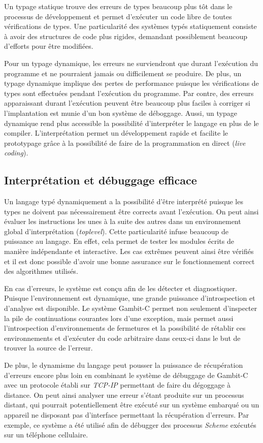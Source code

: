 \documentclass[12pt,twoside,letterpaper,francais]{book}
\newcommand{\Schemelang}{{\textit{Scheme }}}
\begin{document}
Un typage statique trouve des erreurs de types beaucoup plus tôt dans
le processus de développement et permet d'exécuter un code libre de
toutes vérifications de types. Une particularité des systèmes typés
statiquement consiste à avoir des structures de code plus rigides,
demandant possiblement beaucoup d'efforts pour être modifiées.

Pour un typage dynamique, les erreurs ne surviendront que durant
l'exécution du programme et ne pourraient jamais ou difficilement se
produire. De plus, un typage dynamique implique des pertes de
performance puisque les vérifications de types sont effectuées pendant
l'exécution du programme. Par contre, des erreurs apparaissant durant
l'exécution peuvent être beaucoup plus faciles à corriger si
l'implantation est munie d'un bon système de déboggage. Aussi, un
typage dynamique rend plus accessible la possibilité d'interpréter le
langage en plus de le compiler. L'interprétation permet un
développement rapide et facilite le prototypage grâce à la possibilité
de faire de la programmation en direct (\textit{live coding}).


\FloatBarrier
\subsection{Interprétation et débuggage efficace}
Un langage typé dynamiquement a la possibilité d'être interprété
puisque les types ne doivent pas nécessairement être corrects avant
l'exécution. On peut ainsi évaluer les instructions les unes à la
suite des autres dans un environnement global d'interprétation
(\textit{toplevel}). Cette particularité infuse beaucoup de puissance
au langage. En effet, cela permet de tester les modules écrits de
manière indépendante et interactive. Les cas extrêmes peuvent ainsi
être vérifiés et il est donc possible d'avoir une bonne assurance sur
le fonctionnement correct des algorithmes utilisés.

En cas d'erreurs, le système est conçu afin de les détecter et
diagnostiquer. Puisque l'environnement est dynamique, une grande
puissance d'introspection et d'analyse est disponible. Le système
Gambit-C permet non seulement d'inspecter la pile de continuations
courantes lors d'une exception, mais permet aussi l'introspection
d'environnements de fermetures et la possibilité de rétablir ces
environnements et d'exécuter du code arbitraire dans ceux-ci dans le
but de trouver la source de l'erreur.

De plus, le dynamisme du langage peut pousser la puissance de
récupération d'erreurs encore plus loin en combinant le système de
débuggage de Gambit-C avec un protocole établi sur \textit{TCP-IP}
permettant de faire du dégoggage à distance. On peut ainsi analyser
une erreur s'étant produite sur un processus distant, qui pourrait
potentiellement être exécuté sur un système embarqué ou un appareil ne
disposant pas d'interface permettant la récupération d'erreurs. Par
exemple, ce système a été utilisé afin de débugger des processus
\Schemelang exécutés sur un téléphone cellulaire.
\end{document}
